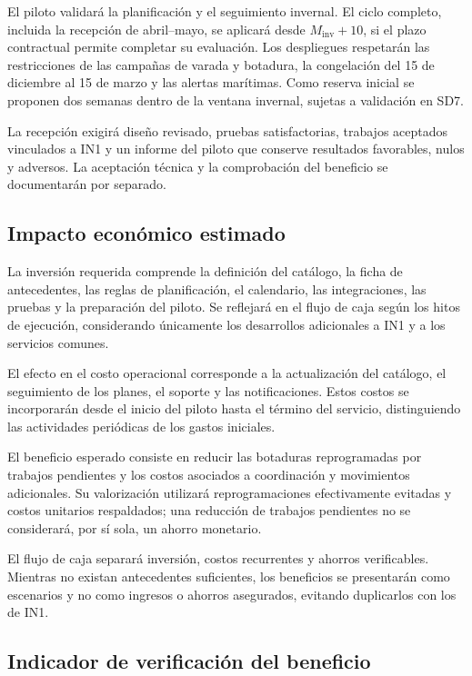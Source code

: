 El piloto validará la planificación y el seguimiento invernal.
El ciclo completo, incluida la recepción de abril--mayo, se
aplicará desde $M_{\mathrm{inv}}+10$, si el plazo contractual
permite completar su evaluación. Los despliegues respetarán las
restricciones de las campañas de varada y botadura, la congelación
del 15 de diciembre al 15 de marzo y las alertas marítimas. Como
reserva inicial se proponen dos semanas dentro de la ventana
invernal, sujetas a validación en SD7.

La recepción exigirá diseño revisado, pruebas satisfactorias,
trabajos aceptados vinculados a IN1 y un informe del piloto que
conserve resultados favorables, nulos y adversos. La aceptación
técnica y la comprobación del beneficio se documentarán por separado.


\subsection{Impacto económico estimado}

La inversión requerida comprende la definición del catálogo,
la ficha de antecedentes, las reglas de planificación, el calendario,
las integraciones, las pruebas y la preparación del piloto.
Se reflejará en el flujo de caja según los hitos de ejecución,
considerando únicamente los desarrollos adicionales a IN1 y
a los servicios comunes.

El efecto en el costo operacional corresponde a la actualización
del catálogo, el seguimiento de los planes, el soporte y las
notificaciones. Estos costos se incorporarán desde el inicio
del piloto hasta el término del servicio, distinguiendo las
actividades periódicas de los gastos iniciales.

El beneficio esperado consiste en reducir las botaduras
reprogramadas por trabajos pendientes y los costos asociados
a coordinación y movimientos adicionales. Su valorización
utilizará reprogramaciones efectivamente evitadas y costos
unitarios respaldados; una reducción de trabajos pendientes
no se considerará, por sí sola, un ahorro monetario.

El flujo de caja separará inversión, costos recurrentes y
ahorros verificables. Mientras no existan antecedentes suficientes,
los beneficios se presentarán como escenarios y no como ingresos
o ahorros asegurados, evitando duplicarlos con los de IN1.


\subsection{Indicador de verificación del beneficio}

